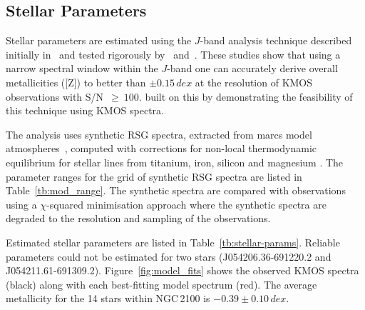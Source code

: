 \documentclass[useAMS,usenatbib]{mn2e}
\begin{document}




\subsection{Stellar Parameters} %
\label{sub:stellar_parameters}

Stellar parameters are estimated using the $J$-band analysis technique described initially in~\cite{2010MNRAS.407.1203D}
and tested rigorously by~\cite{2014ApJ...788...58G} and~\cite{2015ApJ...806...21D}.
These studies show that using a narrow spectral window within the $J$-band one can accurately derive overall metallicities ([Z]) to better than
$\pm0.15\,dex$ at the resolution of KMOS observations with S/N~$\ge~100$.
\cite{2015ApJ...803...14P} built on this by demonstrating the feasibility of this technique using KMOS spectra.

The analysis uses synthetic RSG spectra, extracted from {\sc marcs} model atmospheres~\citep{2008A&A...486..951G},
computed with corrections for non-local thermodynamic equilibrium for stellar lines from titanium, iron, silicon and magnesium
\citep{2012ApJ...751..156B,2013ApJ...764..115B,2015ApJ...804..113B}.
The parameter ranges for the grid of synthetic RSG spectra are listed in Table~\ref{tb:mod_range}.
The synthetic spectra are compared with observations using a $\chi$-squared minimisation approach where the synthetic spectra are degraded to the resolution and sampling of the observations.

Estimated stellar parameters are listed in Table~\ref{tb:stellar-params}.
Reliable parameters could not be estimated for two stars (J054206.36-691220.2 and J054211.61-691309.2).
Figure~\ref{fig:model_fits} shows the observed KMOS spectra (black) along with each best-fitting model spectrum (red).
The average metallicity for the 14 stars within NGC\,2100 is $-0.39\pm0.10\,dex$.
\end{document}
